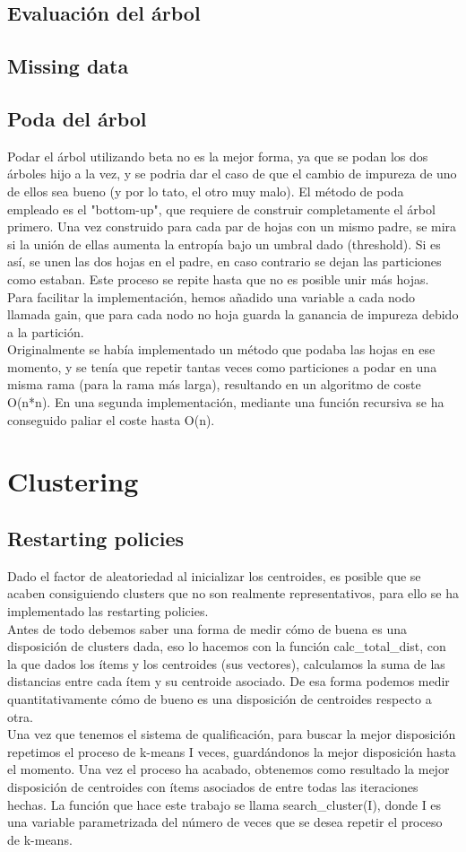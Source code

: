 \documentclass{article}
\begin{document}
\subsection{Evaluación del árbol}
\subsection{Missing data}
\subsection{Poda del árbol}
Podar el árbol utilizando beta no es la mejor
forma, ya que se podan los dos árboles hijo a la vez,
y se podria dar el caso de que el cambio de impureza de 
uno de ellos sea bueno (y por lo tato, el otro muy malo).
El método de poda empleado es el "bottom-up", que 
requiere de construir completamente el árbol primero.
Una vez construido para cada par de hojas con un mismo
padre, se mira si la unión de ellas aumenta la entropía
bajo un umbral dado (threshold). Si es así, se unen las 
dos hojas en el padre, en caso contrario se dejan las particiones
como estaban. Este proceso se repite hasta que no es posible
unir más hojas.\\
Para facilitar la implementación, hemos añadido una variable
a cada nodo llamada gain, que para cada nodo no hoja guarda 
la ganancia de impureza debido a la partición.\\ 
Originalmente se había implementado un método que podaba las hojas
en ese momento, y se tenía que repetir tantas veces como particiones 
a podar en una misma rama (para la rama más larga), resultando en un 
algoritmo de coste O(n*n).
En una segunda implementación, mediante una función recursiva se ha 
conseguido paliar el coste hasta O(n).

\section{Clustering}
\subsection{Restarting policies}
Dado el factor de aleatoriedad al inicializar los centroides,
es posible que se acaben consiguiendo clusters que no son 
realmente representativos, para ello se ha implementado las
restarting policies.\\
Antes de todo debemos saber una forma de medir cómo de buena
es una disposición de clusters dada, eso lo hacemos con la
función calc\_total\_dist, con la que dados los ítems y los 
centroides (sus vectores), calculamos la suma de las distancias
entre cada ítem y su centroide asociado. De esa forma podemos medir
quantitativamente cómo de bueno es una disposición de centroides 
respecto a otra.\\
Una vez que tenemos el sistema de qualificación, para buscar la mejor
disposición repetimos el proceso de k-means I veces, guardándonos
la mejor disposición hasta el momento. Una vez el proceso ha acabado,
obtenemos como resultado la mejor disposición de centroides con ítems
asociados de entre todas las iteraciones hechas. La función que hace este
trabajo se llama search\_cluster(I), donde I es una variable parametrizada 
del número de veces que se desea repetir el proceso de k-means. 
\end{document}
